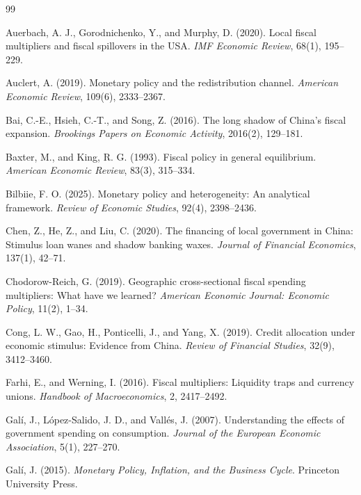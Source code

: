 \documentclass[12pt,UTF8]{ctexart}
\begin{document}
	\begin{thebibliography}{99}
		\addtolength{\itemsep}{-0.3em}
		
		Auerbach, A. J., Gorodnichenko, Y., and Murphy, D. (2020). Local fiscal multipliers and fiscal spillovers in the USA. \textit{IMF Economic Review}, 68(1), 195--229.
		
		Auclert, A. (2019). Monetary policy and the redistribution channel. \textit{American Economic Review}, 109(6), 2333--2367.
		
		Bai, C.-E., Hsieh, C.-T., and Song, Z. (2016). The long shadow of China's fiscal expansion. \textit{Brookings Papers on Economic Activity}, 2016(2), 129--181.
		
		Baxter, M., and King, R. G. (1993). Fiscal policy in general equilibrium. \textit{American Economic Review}, 83(3), 315--334.
		
		Bilbiie, F. O. (2025). Monetary policy and heterogeneity: An analytical framework. \textit{Review of Economic Studies}, 92(4), 2398--2436.
		
		Chen, Z., He, Z., and Liu, C. (2020). The financing of local government in China: Stimulus loan wanes and shadow banking waxes. \textit{Journal of Financial Economics}, 137(1), 42--71.
		
		Chodorow-Reich, G. (2019). Geographic cross-sectional fiscal spending multipliers: What have we learned? \textit{American Economic Journal: Economic Policy}, 11(2), 1--34.
		
		Cong, L. W., Gao, H., Ponticelli, J., and Yang, X. (2019). Credit allocation under economic stimulus: Evidence from China. \textit{Review of Financial Studies}, 32(9), 3412--3460.
		
		Farhi, E., and Werning, I. (2016). Fiscal multipliers: Liquidity traps and currency unions. \textit{Handbook of Macroeconomics}, 2, 2417--2492.
		
		Galí, J., López-Salido, J. D., and Vallés, J. (2007). Understanding the effects of government spending on consumption. \textit{Journal of the European Economic Association}, 5(1), 227--270.
		
		Galí, J. (2015). \textit{Monetary Policy, Inflation, and the Business Cycle}. Princeton University Press.
		

\end{thebibliography}
\end{document}
